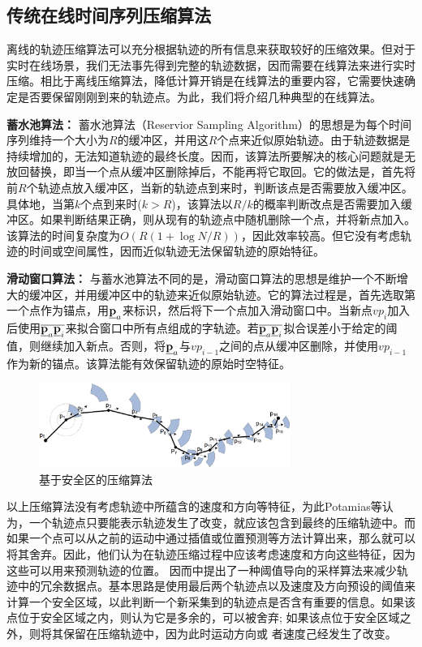 \subsection{传统在线时间序列压缩算法}
离线的轨迹压缩算法可以充分根据轨迹的所有信息来获取较好的压缩效果。但对于实时在线场景，我们无法事先得到完整的轨迹数据，因而需要在线算法来进行实时压缩。相比于离线压缩算法，降低计算开销是在线算法的重要内容，它需要快速确定是否要保留刚刚到来的轨迹点。为此，我们将介绍几种典型的在线算法。

\textbf{蓄水池算法：}
蓄水池算法（Reservior Sampling Algorithm）\cite{Reservoir}的思想是为每个时间序列维持一个大小为$R$的缓冲区，并用这$R$个点来近似原始轨迹。由于轨迹数据是持续增加的，无法知道轨迹的最终长度。因而，该算法所要解决的核心问题就是无放回替换，即当一个点从缓冲区删除掉后，不能再将它取回。它的做法是，首先将前$R$个轨迹点放入缓冲区，当新的轨迹点到来时，判断该点是否需要放入缓冲区。具体地，当第$k$个点到来时($k>R$)，该算法以$R/k$的概率判断改点是否需要加入缓冲区。如果判断结果正确，则从现有的轨迹点中随机删除一个点，并将新点加入。该算法的时间复杂度为$O(R(1+\log N/R))$，因此效率较高。但它没有考虑轨迹的时间或空间属性，因而近似轨迹无法保留轨迹的原始特征。

\textbf{滑动窗口算法：}
与蓄水池算法不同的是，滑动窗口算法\cite{ICDMSiding,EDBTSliding}的思想是维护一个不断增大的缓冲区，并用缓冲区中的轨迹来近似原始轨迹。它的算法过程是，首先选取第一个点作为锚点，用$\emph{{\textbf{p}}}_a$来标识，然后将下一个点加入滑动窗口中。当新点$vp_{i}$加入后使用$\overline{\emph{{\textbf{p}}}_a \emph{{\textbf{p}}}_i}$来拟合窗口中所有点组成的字轨迹。若$\overline{\emph{{\textbf{p}}}_a \emph{{\textbf{p}}}_i}$拟合误差小于给定的阈值，则继续加入新点。否则，将$\emph{{\textbf{p}}}_a$与$vp_{i-1}$之间的点从缓冲区删除，并使用$vp_{i-1}$作为新的锚点。该算法能有效保留轨迹的原始时空特征。

\begin{figure}
	\centering
	\includegraphics[width=0.73\textwidth]{Fig/chapter2/safearea}
	\caption{基于安全区的压缩算法\cite{Zheng2011Computing}}
	\label{fig-chapter2-safeare}
\end{figure}
以上压缩算法没有考虑轨迹中所蕴含的速度和方向等特征，为此Potamias\cite{SSDBMSample}等认为，一个轨迹点只要能表示轨迹发生了改变，就应该包含到最终的压缩轨迹中。而如果一个点可以从之前的运动中通过插值或位置预测等方法计算出来，那么就可以将其舍弃。因此，他们认为在轨迹压缩过程中应该考虑速度和方向这些特征，因为这些可以用来预测轨迹的位置。
因而中提出了一种阈值导向的采样算法来减少轨迹中的冗余数据点。基本思路是使用最后两个轨迹点以及速度及方向预设的阈值来计算一个安全区域，以此判断一个新采集到的轨迹点是否含有重要的信息。如果该点位于安全区域之内，则认为它是多余的，可以被舍弃; 如果该点位于安全区域之外，则将其保留在压缩轨迹中，因为此时运动方向或 者速度己经发生了改变。

